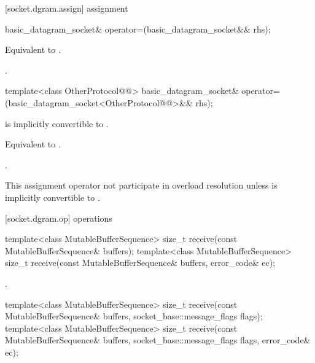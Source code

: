[socket.dgram.assign]{ assignment}

\begin{itemdecl}
basic_datagram_socket& operator=(basic_datagram_socket&& rhs);
\end{itemdecl}

\begin{itemdescr}
\pnum
\effects Equivalent to .

\pnum
\returns {}.
\end{itemdescr}

\begin{itemdecl}
template<class OtherProtocol@@>
  basic_datagram_socket& operator=(basic_datagram_socket<OtherProtocol@@>&& rhs);
\end{itemdecl}

\begin{itemdescr}
\pnum
\requires {} is implicitly convertible to .

\pnum
\effects Equivalent to .

\pnum
\returns {}.

\pnum
\remarks This assignment operator not participate in overload resolution unless  is implicitly convertible to .
\end{itemdescr}



[socket.dgram.op]{ operations}

\begin{itemdecl}
template<class MutableBufferSequence>
  size_t receive(const MutableBufferSequence& buffers);
template<class MutableBufferSequence>
  size_t receive(const MutableBufferSequence& buffers,
                 error_code& ec);
\end{itemdecl}

\begin{itemdescr}
\pnum
\returns {}.
\end{itemdescr}

\begin{itemdecl}
template<class MutableBufferSequence>
  size_t receive(const MutableBufferSequence& buffers,
                 socket_base::message_flags flags);
template<class MutableBufferSequence>
  size_t receive(const MutableBufferSequence& buffers,
                 socket_base::message_flags flags, error_code& ec);
\end{itemdecl}

